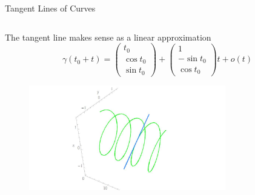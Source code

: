 \documentclass[smaller,hyperref={CJKbookmarks=true}]{beamer}
\begin{document}
\begin{frame}{Tangent Lines of Curves}
\begin{spacing}{1}
\begin{columns}[onlytextwidth]
\begin{column}{0.6\textwidth}
\end{column}
\end{columns}
\newpage
The tangent line makes sense as a linear approximation
\[\gamma(t_0+t)=\begin{pmatrix}
                  t_0 \\
                  \cos t_0 \\
                  \sin t_0
                \end{pmatrix}+\begin{pmatrix}
                                1 \\
                                -\sin t_0 \\
                                \cos t_0
                              \end{pmatrix}t+o(t)\]
\vspace*{-13pt}
\begin{figure}
  \centering
  \includegraphics[width=\textwidth,height=130pt]{50.jpg}

\end{figure}
\end{spacing}
\end{frame}
\end{document}
